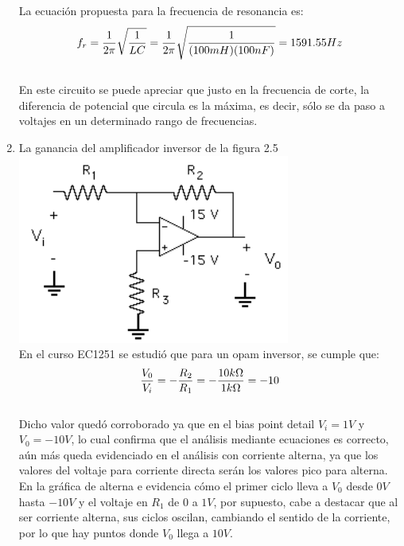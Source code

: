 \documentclass[12pt]{article}
\begin{document}
\begin{enumerate}
		\noindent La ecuación propuesta para la frecuencia de resonancia es:\\
		
		\begin{equation}
			\notag f_r = \frac{1}{2\pi}\sqrt{\frac{1}{LC}} = \frac{1}{2\pi}\sqrt{\frac{1}{(100mH)(100nF)}} = 1591.55Hz
		\end{equation}\\
	
		\noindent En este circuito se puede apreciar que justo en la frecuencia de corte, la diferencia de potencial que circula es la máxima, es decir, sólo se da paso a voltajes en un determinado rango de frecuencias.\\
		
		\item La ganancia del amplificador inversor de la figura 2.5\\
		
		\includegraphics{Img/2_5}\\
		
		\noindent En el curso EC1251 se estudió que para un opam inversor, se cumple que:\\
		
		\begin{equation}
			\notag \frac{V_0}{V_i} = -\frac{R_2}{R_1} = -\frac{10k\Omega}{1k\Omega} = -10
		\end{equation}\\
	
		\noindent Dicho valor quedó corroborado ya que en el bias point detail $V_i = 1V$ y $V_0 = -10V$, lo cual confirma que el análisis mediante ecuaciones es correcto, aún más queda evidenciado en el análisis con corriente alterna, ya que los valores del voltaje para corriente directa serán los valores pico para alterna. En la gráfica de alterna e evidencia cómo el primer ciclo lleva a $V_0$ desde $0V$ hasta $-10V$ y el voltaje en $R_1$ de $0$ a $1V$, por supuesto, cabe a destacar que al ser corriente alterna, sus ciclos oscilan, cambiando el sentido de la corriente, por lo que hay puntos donde $V_0$ llega a $10V$.\\
		

\end{enumerate}
\end{document}
